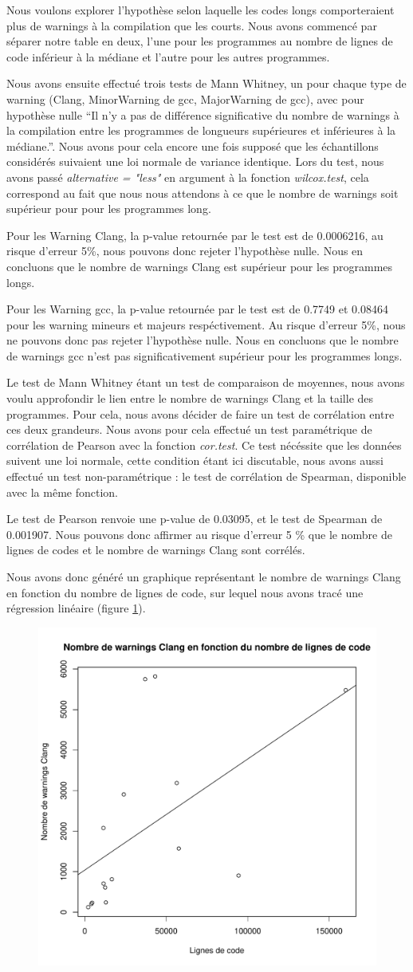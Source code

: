 Nous voulons explorer l'hypothèse selon laquelle les codes longs
comporteraient plus de warnings à la compilation que les courts. Nous
avons commencé par séparer notre table en deux, l'une pour les
programmes au nombre de lignes de code inférieur à la médiane et
l'autre pour les autres programmes. 

Nous avons ensuite effectué trois tests de Mann Whitney, un pour chaque
type de warning (Clang, MinorWarning de gcc, MajorWarning de gcc),
avec pour hypothèse nulle ``Il n'y a pas de différence significative
du nombre de warnings à la compilation entre les programmes de
longueurs supérieures et inférieures à la médiane.''. Nous avons pour
cela encore une fois supposé que les échantillons considérés suivaient
une loi normale de variance identique. Lors du test, nous avons passé
\emph{alternative = "less"} en argument à la fonction
\emph{wilcox.test}, cela correspond au fait que nous nous attendons à
ce que le nombre de warnings soit supérieur pour pour les programmes
long.

Pour les Warning Clang, la p-value retournée par le test est de
0.0006216, au risque d'erreur 5\%, nous pouvons donc rejeter
l'hypothèse nulle. Nous en concluons que le nombre de warnings Clang
est supérieur pour les programmes longs.

Pour les Warning gcc, la p-value retournée par le test est de 0.7749
et 0.08464 pour les warning mineurs et majeurs respéctivement. Au
risque d'erreur 5\%, nous ne pouvons donc pas rejeter l'hypothèse
nulle. Nous en concluons que le nombre de warnings gcc n'est pas
significativement supérieur pour les programmes longs.

Le test de Mann Whitney étant un test de comparaison de moyennes, nous
avons voulu approfondir le lien entre le nombre de warnings Clang et la
taille des programmes. Pour cela, nous avons décider de faire un test de
corrélation entre ces deux grandeurs. Nous avons pour cela effectué un
test paramétrique de corrélation de Pearson avec la fonction
\emph{cor.test}. Ce test nécéssite que les données suivent une loi
normale, cette condition étant ici discutable, nous avons aussi
effectué un test non-paramétrique : le test de
corrélation de Spearman, disponible avec la même fonction. 

Le test de Pearson renvoie une p-value de 0.03095, et le test de
Spearman de 0.001907. Nous pouvons donc affirmer au risque d'erreur 5 \%
que le nombre de lignes de codes et le nombre de warnings Clang sont
corrélés.

Nous avons donc généré un graphique représentant le nombre de warnings
Clang en fonction du nombre de lignes de code, sur lequel nous avons
tracé une régression linéaire (figure \ref{fig:clang_lin}).


\begin{figure}[h]
  \centering
  \includegraphics[width=.48\textwidth]{figures/clang_lin.pdf}
  \caption{}\label{fig:clang_lin}
\end{figure}